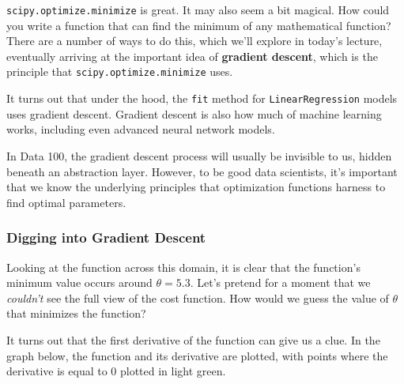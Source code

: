 \documentclass[
  letterpaper,
  DIV=11,
  numbers=noendperiod]{scrreprt}
\begin{document}
\texttt{scipy.optimize.minimize} is great. It may also seem a bit
magical. How could you write a function that can find the minimum of any
mathematical function? There are a number of ways to do this, which
we'll explore in today's lecture, eventually arriving at the important
idea of \textbf{gradient descent}, which is the principle that
\texttt{scipy.optimize.minimize} uses.

It turns out that under the hood, the \texttt{fit} method for
\texttt{LinearRegression} models uses gradient descent. Gradient descent
is also how much of machine learning works, including even advanced
neural network models.

In Data 100, the gradient descent process will usually be invisible to
us, hidden beneath an abstraction layer. However, to be good data
scientists, it's important that we know the underlying principles that
optimization functions harness to find optimal parameters.

\subsubsection{Digging into Gradient
Descent}\label{digging-into-gradient-descent}

Looking at the function across this domain, it is clear that the
function's minimum value occurs around \(\theta = 5.3\). Let's pretend
for a moment that we \emph{couldn't} see the full view of the cost
function. How would we guess the value of \(\theta\) that minimizes the
function?

It turns out that the first derivative of the function can give us a
clue. In the graph below, the function and its derivative are plotted,
with points where the derivative is equal to 0 plotted in light green.
\end{document}
